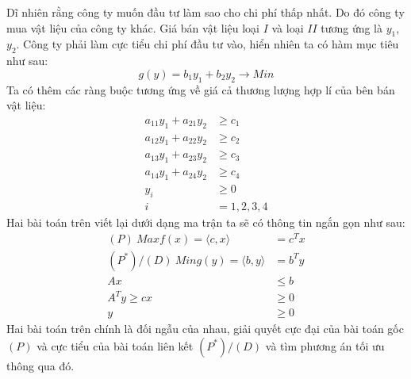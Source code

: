 \documentclass{article}
\begin{document}
            Dĩ nhiên rằng công ty muốn đầu tư làm sao cho chi phí thấp nhất. Do đó công ty mua vật liệu của công ty khác. Giá bán vật liệu loại $I$ và loại $II$ tương ứng là $y_1$, $y_2$. Công ty phải làm cực tiểu chi phí đầu tư vào, hiển
            nhiên ta có hàm mục tiêu như sau: \\
                \begin{equation}
                    g(y)=b_1y_1+b_2y_2 \rightarrow Min
                \end{equation}
            Ta có thêm các ràng buộc tương ứng về giá cả thương lượng hợp lí của bên bán vật liệu:
                \begin{equation}
                    \begin{split}
                        a_{11}y_1+a_{21}y_2 &\geq c_1 \\
                        a_{12}y_1+a_{22}y_2 &\geq c_2 \\
                        a_{13}y_1+a_{23}y_2 &\geq c_3 \\
                        a_{14}y_1+a_{24}y_2 &\geq c_4 \\
                        y_i &\geq 0 \\
                        i &= 1, 2, 3, 4
                    \end{split}
                \end{equation}
            Hai bài toán trên viết lại dưới dạng ma trận ta sẽ có thông tin ngắn gọn như sau:
                \begin{equation}
                    \begin{split}
                        (P) \: Max f(x) = \langle c,x \rangle &= c^Tx \\
                        (P^*)/(D) \: Min g(y) = \langle b,y \rangle &= b^Ty \\
                        Ax &\leq b \\
                        A^Ty \geq cx &\geq 0 \\
                        y &\geq 0
                    \end{split}
                \end{equation} 
            Hai bài toán trên chính là đối ngẫu của nhau, giải quyết cực đại của bài toán gốc $(P)$ và cực tiểu của bài toán liên kết $(P^*)/(D)$ và tìm phương án tối ưu thông qua đó.
\end{document}
